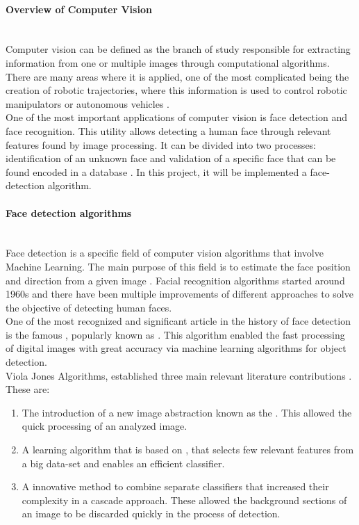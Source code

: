\documentclass[11pt]{report} %
\newcommand{\subsubsubsection}[1]{\paragraph{#1}\mbox{}\\}
\begin{document}
\subsubsubsection{Overview of Computer Vision}

Computer vision can be defined as the branch of study responsible for extracting information from one or multiple images through computational algorithms. There are many areas where it is applied, one of the most complicated being the creation of robotic trajectories, where this information is used to control robotic manipulators or autonomous vehicles \citep{cite_computer_vision_advances_in_computers}.\\

One of the most important applications of computer vision is face detection and face recognition. This utility allows detecting a human face through relevant features found by image processing. It can be divided into two processes: identification of an unknown face and validation of a specific face that can be found encoded in a database \citep{cite_computer_vision_techniques_for_face_recognition}. In this project, it will be implemented a face-detection algorithm.\\

\subsubsubsection{Face detection algorithms}

Face detection is a specific field of computer vision algorithms that involve Machine Learning. The main purpose of this field is to estimate the face position and direction from a given image \citep{cite_face_detection_science_direct_article}. Facial recognition algorithms started around 1960s and there have been multiple improvements of different approaches to solve the objective of detecting human faces.\\

One of the most recognized and significant article in the history of face detection is the famous , popularly known as  \citep{cite_viola_jones_face_detection_algorithm}. This algorithm enabled the fast processing of digital images with great accuracy via machine learning algorithms for object detection.\\

Viola Jones Algorithms, established three main relevant literature contributions \citep{cite_viola_jones_face_detection_algorithm}. These are:\\

\begin{enumerate}
    \item The introduction of a new image abstraction known as the . This allowed the quick processing of an analyzed image.
    \item A learning algorithm that is based on , that selects few relevant features from a big data-set and enables an efficient classifier.
    \item A innovative method to combine separate classifiers that increased their complexity in a cascade approach. These allowed the background sections of an image to be discarded quickly in the process of detection.\\
\end{enumerate}
\end{document}
